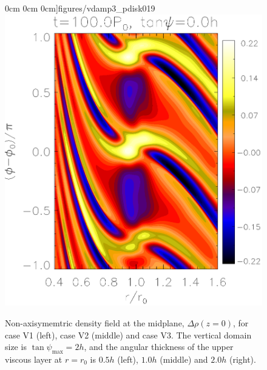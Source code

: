 \begin{figure}
     0cm 0cm
     0cm]{figures/vdamp3_pdisk019}\includegraphics[scale=.27,clip=true,clip=true,trim=2.3cm
     0cm 0cm
     0cm]{figures/vdamp0_nu4_pdisk019}%
    \caption{Non-axisymemtric density field at the midplane,
      $\Delta\rho(z=0)$, for case V1 (left), case V2 (middle) and case
      V3. The vertical domain size is $\tan{\psi_\mathrm{max}} = 2h$,
      and the angular thickness of the upper viscous layer at $r=r_0$
      is $0.5h$ (left), $1.0h$ (middle) and $2.0h$ (right).   
      \label{vdamp2}}
\end{figure}


